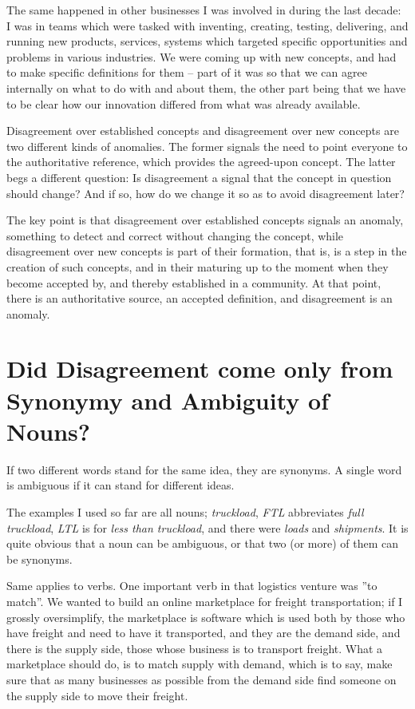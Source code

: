 \documentclass[graybox,envcountchap,sectrefs]{svmono}
\begin{document}
The same happened in other businesses I was involved in during the last decade: I was in teams which were tasked with inventing, creating, testing, delivering, and running new products, services, systems which targeted specific opportunities and problems in various industries. We were coming up with new concepts, and had to make specific definitions for them -- part of it was so that we can agree internally on what to do with and about them, the other part being that we have to be clear how our innovation differed from what was already available.

Disagreement over established concepts and disagreement over new concepts are two different kinds of anomalies. The former signals the need to point everyone to the authoritative reference, which provides the agreed-upon concept. The latter begs a different question: Is disagreement a signal that the concept in question should change? And if so, how do we change it so as to avoid disagreement later? 

The key point is that disagreement over established concepts signals an anomaly, something to detect and correct without changing the concept, while disagreement over new concepts is part of their formation, that is, is a step in the creation of such concepts, and in their maturing up to the moment when they become accepted by, and thereby established in a community. At that point, there is an authoritative source, an accepted definition, and disagreement is an anomaly.


\section{Did Disagreement come only from Synonymy and Ambiguity of Nouns?}
If two different words stand for the same idea, they are synonyms. A single word is ambiguous if it can stand for different ideas. 

The examples I used so far are all nouns; \textit{truckload}, \textit{FTL} abbreviates \textit{full truckload}, \textit{LTL} is for \textit{less than truckload}, and there were \textit{loads} and \textit{shipments}. It is quite obvious that a noun can be ambiguous, or that two (or more) of them can be synonyms. 

Same applies to verbs. One important verb in that logistics venture was ''to match''. We wanted to build an online marketplace for freight transportation; if I grossly oversimplify, the marketplace is software which is used both by those who have freight and need to have it transported, and they are the demand side, and there is the supply side, those whose business is to transport freight. What a marketplace should do, is to match supply with demand, which is to say, make sure that as many businesses as possible from the demand side find someone on the supply side to move their freight.
\end{document}
